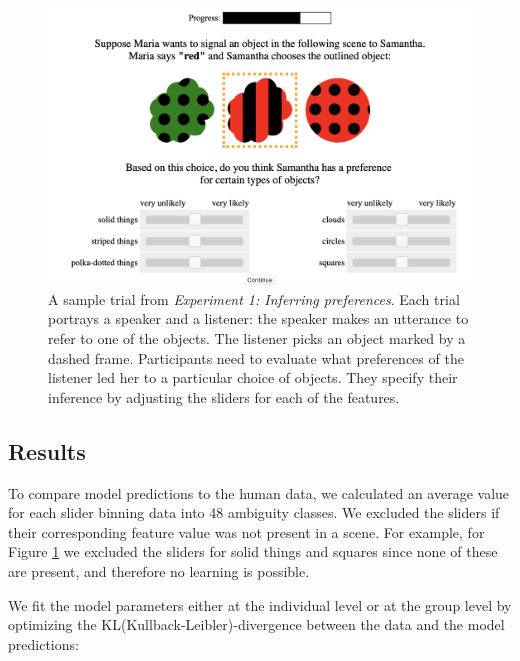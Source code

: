 \documentclass[10pt,a4paper]{article}
\newcommand{\gcs}[1]{\textcolor{blue}{[gcs: #1]}}
\begin{document}
\begin{figure}[ht!]
	\centering
	\includegraphics[width=4.5in]{images/preference-trial.png}
	\caption{ \small{A sample trial from \emph{Experiment 1: Inferring preferences}. Each trial portrays a speaker and a listener: the speaker makes an utterance to refer to one of the objects. The listener picks an object marked by a dashed frame. Participants need to evaluate what preferences of the listener led her to a particular choice of objects. They specify their inference by adjusting the sliders for each of the features}.}\label{exp1-trial}
\end{figure}

\subsection{Results}

To compare model predictions to the human data, we calculated an average value for each slider binning data into 48 ambiguity classes. We excluded the sliders if their corresponding feature value was not present in a scene. For example, for Figure \ref{exp1-trial} we excluded the sliders for solid things and squares since none of these are present, and therefore no learning is possible.

We fit the model parameters either at the individual level or at the group level by optimizing the KL(Kullback-Leibler)-divergence between the data and the model predictions:
\end{document}

